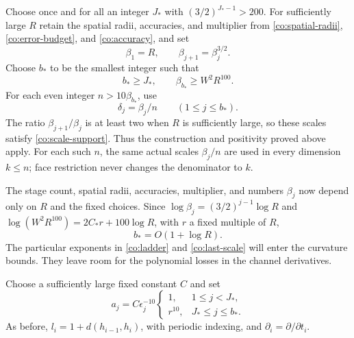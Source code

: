 Choose once and for all an integer $J_*$ with
$(3/2)^{J_*-1}>200$.  For sufficiently large $R$ retain the spatial
radii, accuracies, and multiplier from
\eqref{co:spatial-radii}, \eqref{co:error-budget}, and
\eqref{co:accuracy}, and set
\begin{equation}
 \beta_1=R,\qquad \beta_{j+1}=\beta_j^{3/2}.
 \label{co:ladder}
\end{equation}
Choose $b_*$ to be the smallest integer such that
\begin{equation}
 b_*\geq J_*,\qquad \beta_{b_*}\geq W^2R^{100}.
 \label{co:last-scale}
\end{equation}
For each even integer $n>10\beta_{b_*}$, use
\begin{equation}
 \delta_j=\beta_j/n\qquad(1\leq j\leq b_*).
 \label{co:time-scales}
\end{equation}
The ratio $\beta_{j+1}/\beta_j$ is at least two when $R$ is sufficiently
large, so these scales satisfy \eqref{co:scale-support}.  Thus the
construction and positivity proved above apply.  For each such $n$, the
same actual scales $\beta_j/n$ are used in every dimension $k\leq n$;
face restriction never changes the denominator to $k$.

The stage count, spatial radii, accuracies, multiplier, and numbers
$\beta_j$ now depend only on $R$ and the fixed choices.  Since
$\log\beta_j=(3/2)^{j-1}\log R$ and
$\log(W^2R^{100})=2C_*r+100\log R$, with $r$ a fixed multiple of $R$,
\begin{equation}
 b_*=O(1+\log R).
 \label{co:stage-count}
\end{equation}
The particular exponents in \eqref{co:ladder} and
\eqref{co:last-scale} will enter the curvature bounds.  They leave room
for the polynomial losses in the channel derivatives.

Choose a sufficiently large fixed constant $C$ and set
\begin{equation}
 a_j=C\epsilon_j^{-10}
 \begin{cases}
 1,&1\leq j<J_*,\\
 r^{10},&J_*\leq j\leq b_*.
 \end{cases}
 \label{co:derivative-constants}
\end{equation}
As before, $l_i=1+d(h_{i-1},h_i)$, with periodic indexing, and
$\partial_i=\partial/\partial t_i$.

